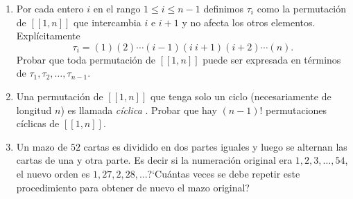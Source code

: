 \begin{enumerate}
\item Por cada entero $i$ en el rango $1 \le i \le n-1$ definimos $\tau_i$ como la permutación de $[[1,n]]$ que intercambia $i$ e $i+1$ y no afecta los otros elementos. Explícitamente 
$$
\tau_i = (1)(2)\cdots(i-1)(i\ i+1)(i+2)\cdots(n).
$$
Probar que toda permutación de $[[1,n]]$ puede ser expresada en términos de $\tau_1,\tau_2,\ldots,\tau_{n-1}$. 

\item Una permutación de $[[1,n]]$ que tenga solo un ciclo (necesariamente de longitud $n$) es llamada {\it cíclica}  . Probar que hay $(n-1)!$ permutaciones cíclicas de $[[1,n]]$.

\item Un mazo de $52$ cartas es dividido en dos partes iguales y luego se alternan las cartas de una y otra parte. Es decir si la numeración original era $1,2,3,\ldots,54$, el nuevo orden es $1,27,2,28,\ldots$?`Cuántas veces se debe repetir este procedimiento para obtener de nuevo el mazo original? 
\end{enumerate}
